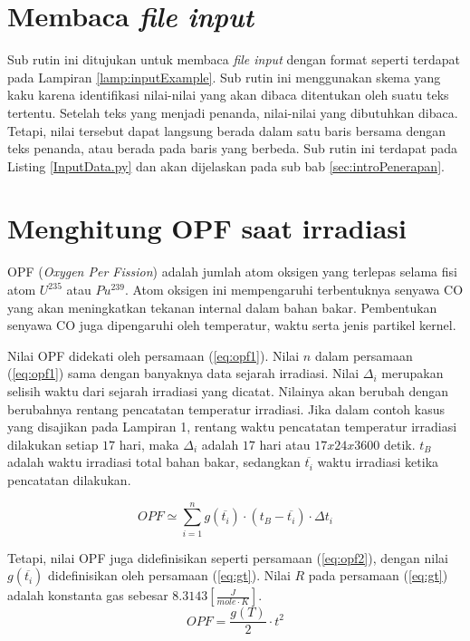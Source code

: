 \documentclass[a4paper,11pt]{report}
\begin{document}
\section{Membaca \textit{file input}}
Sub rutin ini ditujukan untuk membaca \textit{file input} dengan format seperti terdapat pada Lampiran \ref{lamp:inputExample}. Sub rutin ini menggunakan skema yang kaku karena identifikasi nilai-nilai yang akan dibaca ditentukan oleh suatu teks tertentu. Setelah teks yang menjadi penanda, nilai-nilai yang dibutuhkan dibaca. Tetapi, nilai tersebut dapat langsung berada dalam satu baris bersama dengan teks penanda, atau berada pada baris yang berbeda. Sub rutin ini terdapat pada Listing \ref{InputData.py} dan akan dijelaskan pada sub bab \ref{sec:introPenerapan}.
 
\section{Menghitung OPF saat irradiasi}
\label{sec:OPF}
OPF (\textit{Oxygen Per Fission}) adalah jumlah atom oksigen yang terlepas selama fisi atom $U^{235}$ atau $Pu^{239}$. Atom oksigen ini mempengaruhi terbentuknya senyawa CO yang akan meningkatkan tekanan internal dalam bahan bakar. Pembentukan senyawa CO juga dipengaruhi oleh temperatur, waktu serta jenis partikel kernel. 

Nilai OPF didekati oleh persamaan (\ref{eq:opf1}). Nilai $n$ dalam persamaan (\ref{eq:opf1}) sama dengan banyaknya data sejarah irradiasi. Nilai $\Delta_{i}$ merupakan selisih waktu dari sejarah irradiasi yang dicatat. Nilainya akan berubah dengan berubahnya rentang pencatatan temperatur irradiasi. Jika dalam contoh kasus yang disajikan pada Lampiran 1, rentang waktu pencatatan temperatur irradiasi dilakukan setiap $17$ hari, maka $\Delta_{i}$ adalah $17$ hari atau $17 x 24 x 3600$ detik. $t_B$ adalah waktu irradiasi total bahan bakar, sedangkan $\overline{t_i}$ waktu irradiasi ketika pencatatan dilakukan.

\begin{equation}
  OPF \simeq \sum_{i=1}^{n} g(\overline{t_{i}}) \cdot (t_{B}-\overline{t_{i}}) \cdot \Delta t_{i}
  \label{eq:opf1}
\end{equation}
 
Tetapi, nilai OPF juga didefinisikan seperti persamaan (\ref{eq:opf2}), dengan nilai $g(\overline{t_{i}})$ didefinisikan oleh persamaan (\ref{eq:gt}). Nilai $R$ pada persamaan (\ref{eq:gt}) adalah konstanta gas sebesar $8.3143 [\frac{J}{mole \cdot K}]$.
\begin{equation}
  OPF = \frac{g(T)}{2} \cdot t^2
  \label{eq:opf2}
\end{equation} 
 
\end{document}
